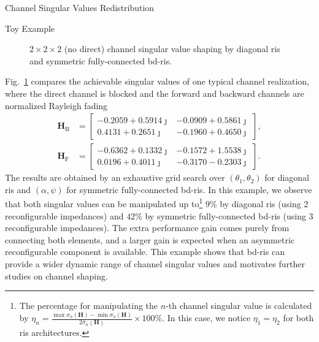 \documentclass[journal]{IEEEtran}
\begin{document}
\begin{section}{Channel Singular Values Redistribution}
\begin{subsection}{Toy Example}
\begin{figure}
			\caption{$2 \times 2 \times 2$ (no direct) channel singular value shaping by diagonal \gls{ris} and symmetric fully-connected \gls{bd}-\gls{ris}.}
			\label{fg:singular_trend}
		\end{figure}
		Fig.~\ref{fg:singular_trend} compares the achievable singular values of one typical channel realization, where the direct channel is blocked and the forward and backward channels are normalized Rayleigh fading
		\begin{equation*}
			\begin{split}
				\mathbf{H}_\mathrm{B} & =
				\begin{bmatrix}
					-0.2059 + 0.5914 \jmath & -0.0909 + 0.5861 \jmath \\
					0.4131 + 0.2651 \jmath & -0.1960 + 0.4650 \jmath
				\end{bmatrix},
				\\
				\mathbf{H}_\mathrm{F} & =
				\begin{bmatrix}
					-0.6362 + 0.1332 \jmath & -0.1572 + 1.5538 \jmath \\
					0.0196 + 0.4011 \jmath & -0.3170 - 0.2303 \jmath
				\end{bmatrix}.
			\end{split}
		\end{equation*}
		The results are obtained by an exhaustive grid search over $(\theta_1, \theta_2)$ for diagonal \gls{ris} and $(\alpha, \psi)$ for symmetric fully-connected \gls{bd}-\gls{ris}.
		In this example, we observe that both singular values can be manipulated up to\footnote{The percentage for manipulating the $n$-th channel singular value is calculated by $\eta_n = \frac{\max \sigma_n(\mathbf{H}) - \min \sigma_n(\mathbf{H})}{2 \bar{\sigma}_n(\mathbf{H})} \times 100\%$. In this case, we notice $\eta_1=\eta_2$ for both \gls{ris} architectures.} $9\%$ by diagonal \gls{ris} (using 2 reconfigurable impedances) and $42\%$ by symmetric fully-connected \gls{bd}-\gls{ris} (using 3 reconfigurable impedances).
		The extra performance gain comes purely from connecting both elements, and a larger gain is expected when an asymmetric reconfigurable component is available.
		This example shows that \gls{bd}-\gls{ris} can provide a wider dynamic range of channel singular values and motivates further studies on channel shaping.
	\end{subsection}


\end{section}
\end{document}
